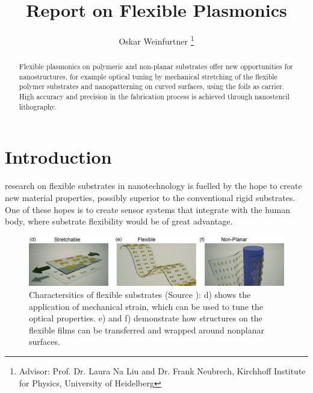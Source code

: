 \documentclass[journal, a4paper]{IEEEtran}
\begin{document}
	\title{Report on Flexible Plasmonics}
	\author{Oskar Weinfurtner
	\thanks{Advisor: Prof. Dr. Laura Na Liu and Dr. Frank Neubrech, Kirchhoff Institute for Physics, University of Heidelberg}}
	\maketitle

\begin{abstract}
Flexible plasmonics on polymeric and non-planar substrates \cite{paper} offer new opportunities for nanostructures, for example optical tuning by mechanical stretching of the flexible polymer substrates and nanopatterning on curved surfaces, using the foils as carrier. High accuracy and precision in the fabrication process is achieved through nanostencil lithography.
\end{abstract}

\section{Introduction}
	 research on flexible substrates in nanotechnology is fuelled by the hope to create new material properties, possibly superior to the conventional rigid substrates. One of these hopes is to create sensor systems that integrate with the human body, where substrate flexibility would be of great advantage. 
	
\begin{figure}[!hbt]
\begin{center}
\includegraphics[width=\columnwidth]{01flexibility.jpg}
\caption{Charactersitics of flexible substrates (Source \cite{paper}): d) shows the application of mechanical strain, which can be used to tune the optical properties. e) and f) demonstrate how structures on the flexible films can be transferred and wrapped around nonplanar surfaces.}
\label{fig:flexibility}
\end{center}
\end{figure}
\end{document}
